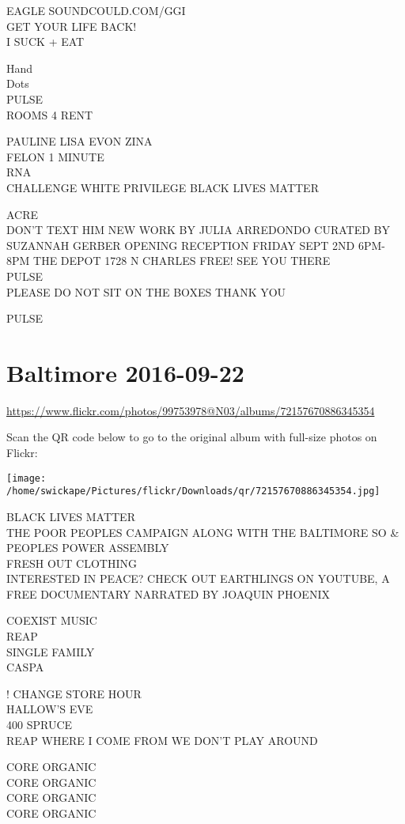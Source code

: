 \documentclass[10pt,letterpaper]{article}
\begin{document}
EAGLE SOUNDCOULD.COM/GGI\\
GET YOUR LIFE BACK!\\
I SUCK + EAT

Hand\\
Dots\\
PULSE\\
ROOMS 4 RENT

PAULINE LISA EVON ZINA\\
FELON 1 MINUTE\\
RNA\\
CHALLENGE WHITE PRIVILEGE BLACK LIVES MATTER

ACRE\\
DON'T TEXT HIM NEW WORK BY JULIA ARREDONDO CURATED BY SUZANNAH GERBER OPENING RECEPTION FRIDAY SEPT 2ND 6PM{-}8PM THE DEPOT 1728 N CHARLES FREE! SEE YOU THERE\\
PULSE\\
PLEASE DO NOT SIT ON THE BOXES THANK YOU

PULSE
\pagebreak

\section*{Baltimore 2016-09-22}

\url{https://www.flickr.com/photos/99753978@N03/albums/72157670886345354}

Scan the QR code below to go to the original album with full-size photos on Flickr:

\texttt{[image: /home/swickape/Pictures/flickr/Downloads/qr/72157670886345354.jpg]}
\pagebreak

BLACK LIVES MATTER\\
THE POOR PEOPLES CAMPAIGN ALONG WITH THE BALTIMORE SO \& PEOPLES POWER ASSEMBLY\\
FRESH OUT CLOTHING\\
INTERESTED IN PEACE?  CHECK OUT EARTHLINGS ON YOUTUBE, A FREE DOCUMENTARY NARRATED BY JOAQUIN PHOENIX

COEXIST MUSIC\\
REAP\\
SINGLE FAMILY\\
CASPA

! CHANGE STORE HOUR\\
HALLOW'S EVE\\
400 SPRUCE\\
REAP WHERE I COME FROM WE DON'T PLAY AROUND

CORE ORGANIC\\
CORE ORGANIC\\
CORE ORGANIC\\
CORE ORGANIC
\end{document}
